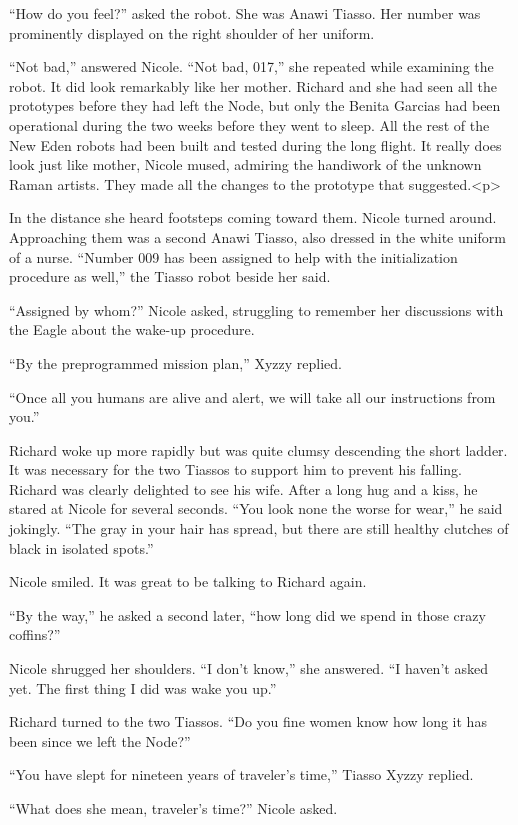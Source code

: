 \documentclass[]{article}
\begin{document}
{“How do you feel?” asked the robot. She was Anawi Tiasso. Her number was prominently displayed on the right shoulder of her uniform.

“Not bad,” answered Nicole. “Not bad, 017,” she repeated while examining the robot. It did look remarkably like her mother. Richard and she had seen all the prototypes before they had left the Node, but only the Benita Garcias had been operational during the two weeks before they went to sleep. All the rest of the New Eden robots had been built and tested during the long flight. It really does look just like mother, Nicole mused, admiring the handiwork of the unknown Raman artists. They made all the changes to the prototype that suggested.<p>

In the distance she heard footsteps coming toward them. Nicole turned around. Approaching them was a second Anawi Tiasso, also dressed in the white uniform of a nurse. “Number 009 has been assigned to help with the initialization procedure as well,” the Tiasso robot beside her said.

“Assigned by whom?” Nicole asked, struggling to remember her discussions with the Eagle about the wake-up procedure.

“By the preprogrammed mission plan,” Xyzzy replied.

“Once all you humans are alive and alert, we will take all our instructions from you.”

Richard woke up more rapidly but was quite clumsy descending the short ladder. It was necessary for the two Tiassos to support him to prevent his falling. Richard was clearly delighted to see his wife. After a long hug and a kiss, he stared at Nicole for several seconds. “You look none the worse for wear,” he said jokingly. “The gray in your hair has spread, but there are still healthy clutches of black in isolated spots.”

Nicole smiled. It was great to be talking to Richard again.

“By the way,” he asked a second later, “how long did we spend in those crazy coffins?”

Nicole shrugged her shoulders. “I don’t know,” she answered. “I haven’t asked yet. The first thing I did was wake you up.”

Richard turned to the two Tiassos. “Do you fine women know how long it has been since we left the Node?”

“You have slept for nineteen years of traveler’s time,” Tiasso Xyzzy replied.

“What does she mean, traveler’s time?” Nicole asked.

}
\end{document}
